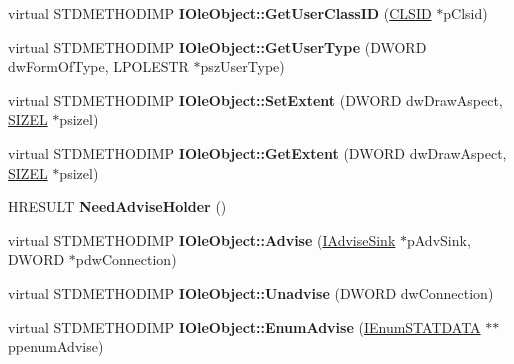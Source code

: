 \begin{DoxyCompactItemize}
virtual S\+T\+D\+M\+E\+T\+H\+O\+D\+I\+MP {\bfseries I\+Ole\+Object\+::\+Get\+User\+Class\+ID} (\hyperlink{struct___i_i_d}{C\+L\+S\+ID} $\ast$p\+Clsid)
\item 
\mbox{\label{class_s_e_a_l_e_d___a29fc925186af0a557a9b62c121554adf}} 
virtual S\+T\+D\+M\+E\+T\+H\+O\+D\+I\+MP {\bfseries I\+Ole\+Object\+::\+Get\+User\+Type} (D\+W\+O\+RD dw\+Form\+Of\+Type, L\+P\+O\+L\+E\+S\+TR $\ast$psz\+User\+Type)
\item 
\mbox{\label{class_s_e_a_l_e_d___a5f330aa541605201884c45bd6f045d56}} 
virtual S\+T\+D\+M\+E\+T\+H\+O\+D\+I\+MP {\bfseries I\+Ole\+Object\+::\+Set\+Extent} (D\+W\+O\+RD dw\+Draw\+Aspect, \hyperlink{structtag_s_i_z_e}{S\+I\+Z\+EL} $\ast$psizel)
\item 
\mbox{\label{class_s_e_a_l_e_d___a987196678f792a96e224e06a06b1c92e}} 
virtual S\+T\+D\+M\+E\+T\+H\+O\+D\+I\+MP {\bfseries I\+Ole\+Object\+::\+Get\+Extent} (D\+W\+O\+RD dw\+Draw\+Aspect, \hyperlink{structtag_s_i_z_e}{S\+I\+Z\+EL} $\ast$psizel)
\item 
\mbox{\label{class_s_e_a_l_e_d___affa49013e4b0f35830675420865ea520}} 
H\+R\+E\+S\+U\+LT {\bfseries Need\+Advise\+Holder} ()
\item 
\mbox{\label{class_s_e_a_l_e_d___a307f746506ca90c011ece2a4fd348f3d}} 
virtual S\+T\+D\+M\+E\+T\+H\+O\+D\+I\+MP {\bfseries I\+Ole\+Object\+::\+Advise} (\hyperlink{interface_i_advise_sink}{I\+Advise\+Sink} $\ast$p\+Adv\+Sink, D\+W\+O\+RD $\ast$pdw\+Connection)
\item 
\mbox{\label{class_s_e_a_l_e_d___aa06f7505900e51a2494129cb6f9548f2}} 
virtual S\+T\+D\+M\+E\+T\+H\+O\+D\+I\+MP {\bfseries I\+Ole\+Object\+::\+Unadvise} (D\+W\+O\+RD dw\+Connection)
\item 
\mbox{\label{class_s_e_a_l_e_d___ac5d4459132622896a90722c84889fe15}} 
virtual S\+T\+D\+M\+E\+T\+H\+O\+D\+I\+MP {\bfseries I\+Ole\+Object\+::\+Enum\+Advise} (\hyperlink{interface_i_enum_s_t_a_t_d_a_t_a}{I\+Enum\+S\+T\+A\+T\+D\+A\+TA} $\ast$$\ast$ppenum\+Advise)
\item 
\mbox{\label{class_s_e_a_l_e_d___a90255b5ff0eb7e07bd3718d5fd2f81f5}} 
$$
\end{DoxyCompactItemize}
